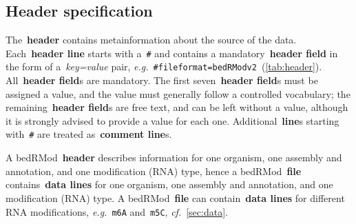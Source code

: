 \documentclass[11pt]{article}
\begin{document}
\subsection{Header specification}\label{sec:header}

The~\textbf{header} contains metainformation about the source of the data. Each~\textbf{header line} starts with a~\texttt{\#} and contains a
mandatory~\textbf{header field} in the form of a~\emph{key=value} pair, \textit{e.g.}~\texttt{\#fileformat=bedRModv2}~(\autoref{tab:header}). All~\textbf{header field}s are mandatory. The first seven~\textbf{header field}s must be assigned a value, and the value must generally follow a controlled vocabulary; the remaining~\textbf{header field}s are free text, and can be left without a value, although it is strongly advised to provide a value for each one. Additional~\textbf{line}s starting with~\texttt{\#} are treated as~\textbf{comment line}s.

A \ac{bedRMod}~\textbf{header} describes information for one organism, one assembly and annotation, and one modification (RNA) type, hence a \ac{bedRMod}~\textbf{file} contains~\textbf{data lines} for one organism, one assembly and annotation, and one modification (RNA) type. A \ac{bedRMod}~\textbf{file} can contain~\textbf{data lines} for different RNA modifications, \textit{e.g.}~\texttt{m6A} and~\texttt{m5C}, \textit{cf.}~\autoref{sec:data}.
\end{document}
